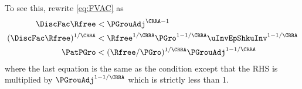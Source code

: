 \documentclass[./BufferStockTheory.tex]{subfiles}
\begin{document}
To see this, rewrite \eqref{eq:FVAC} as 
\begin{equation}\begin{gathered}\begin{aligned}
 \DiscFac \Rfree & < \PGrouAdj^{\CRRA-1}
\\ (\DiscFac \Rfree)^{1/\CRRA}  & < \Rfree^{1/\CRRA} \PGro^{1-1/\CRRA} \uInvEpShkuInv^{1-1/\CRRA}
\\ \PatPGro & < (\Rfree/\PGro)^{1/\CRRA} \PGrouAdj^{1-1/\CRRA}
\end{aligned}\end{gathered}\end{equation}
where the last equation is the same as the {\PFFVAC} condition except that the RHS is multiplied by $\PGrouAdj^{1-1/\CRRA}$ which is strictly less than 1.

\begin{comment}
A useful alternative version is
\begin{verbatimwrite}{\EqDir/FVACAlt}
\begin{equation}\begin{gathered}\begin{aligned}
    \DiscFac \Rfree \PGro^{-\CRRA} \uInvEpShkuInv^{1-\CRRA}   & < \Rfree/\PGro \nonumber
\\ \PatPGro \uInvEpShkuInv^{1/\CRRA-1}  & < (\Rfree/\PGro)^{1/\CRRA} \label{eq:FVACAlt}.
\end{aligned}\end{gathered}\end{equation}
\end{verbatimwrite}

\end{comment}

\begin{comment}
In the case where the permanent shocks are lognormally distributed, we have
\begin{equation}\begin{gathered}\begin{aligned}
\Ex[\pshk^{1-\CRRA}] & = &\exp((1-\CRRA)(-\sigma^{2}_{\pshk}/2)+(1-\CRRA)^{2}\sigma_{\pshk}^{2})
\\  & = \exp((1-\CRRA)((-1/2)+(1-\CRRA))\sigma_{\pshk}^{2})
\\  & = \exp((1-\CRRA)(1/2-\CRRA)\sigma_{\pshk}^{2})
%
\end{aligned}\end{gathered}\end{equation}
\end{comment}

\begin{comment}
Equation
  \eqref{eq:GIC} can be raised to the $\CRRA$ power yielding the
  alternative form $(\Rfree \DiscFac) \PGroAdj^{-\CRRA} < 1$ which
  Deaton~\citeyearpar{deatonLiqConstr} imposed to guarantee that his
  problem defined a contraction mapping.
\end{comment}
\end{document}
